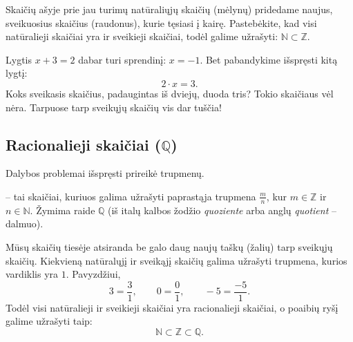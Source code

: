 \documentclass[11pt,a4paper]{scrartcl}
\begin{document}
Skaičių ašyje prie jau turimų natūraliųjų skaičių (mėlynų) pridedame naujus, sveikuosius skaičius (raudonus), kurie tęsiasi į kairę. 
Pastebėkite, kad visi natūralieji skaičiai yra ir sveikieji skaičiai, todėl galime užrašyti: $\mathbb{N} \subset \mathbb{Z}$.

\begin{center}
\end{center}

Lygtis $x + 3 = 2$ dabar turi sprendinį: $x = -1$. Bet pabandykime išspręsti kitą lygtį:
\[ 2 \cdot x = 3. \]
Koks sveikasis skaičius, padaugintas iš dviejų, duoda tris? Tokio skaičiaus vėl nėra. Tarpuose tarp sveikųjų skaičių vis dar tuščia!

\subsection{Racionalieji skaičiai ($\mathbb{Q}$)}

Dalybos problemai išspręsti prireikė trupmenų. 

\begin{definition}
 -- tai skaičiai, kuriuos galima užrašyti paprastąja trupmena $\frac{m}{n}$, kur $m \in \mathbb{Z}$ ir $n \in \mathbb{N}$. Žymima raide $\mathbb{Q}$ (iš italų kalbos žodžio \textit{quoziente} arba anglų \textit{quotient} -- dalmuo).
\end{definition}

Mūsų skaičių tiesėje atsiranda be galo daug naujų taškų (žalių) tarp sveikųjų skaičių. Kiekvieną natūralųjį ir sveikąjį skaičių galima užrašyti trupmena, kurios vardiklis yra $1$. Pavyzdžiui,
\[ 3 = \frac{3}{1}, \qquad 0 = \frac{0}{1}, \qquad -5 = \frac{-5}{1}. \]
Todėl visi natūralieji ir sveikieji skaičiai yra racionalieji skaičiai, o poaibių ryšį galime užrašyti taip:
\[ \mathbb{N} \subset \mathbb{Z} \subset \mathbb{Q}. \]
\end{document}
